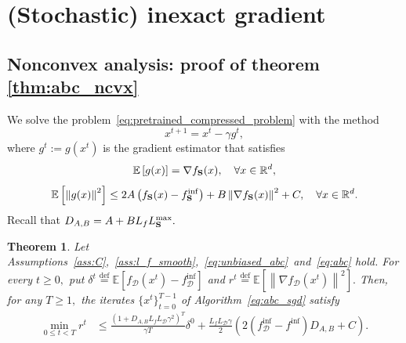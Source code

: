 \documentclass{article}
\newcommand{\bb}{\mathbb}
\newcommand{\eqdef}{\stackrel{\text{def}}{=}}
\newcommand{\Exp}[1]{{\bb E}\left[#1\right]}
\newtheorem{theorem}{Theorem}
\theoremstyle{plain}
\newcommand{\tf}{f_{\mathcal{D}}}
\newcommand{\mS}{{\bf S}}
\theoremstyle{plain}
\theoremstyle{definition}
\theoremstyle{remark}
\begin{document}
\section{(Stochastic) inexact gradient}
\subsection{Nonconvex analysis: proof of theorem \ref{thm:abc_ncvx}}
We solve the problem~\eqref{eq:pretrained_compressed_problem} with the method
\begin{equation}\label{eq:abc_sgd_appendix}
	x^{t+1} = x^t - \gamma g^t,
\end{equation}
where $g^t := g(x^t)$ is the gradient estimator that satisfies
\begin{equation}\label{eq:unbiased_abc_appendix}
	\Exp{g(x)} = \nabla f_{\mS}(x), \quad\forall x \in\mathbb{R}^d,
\end{equation}
\begin{equation}\label{eq:abc_appendix}
	\Exp{\left\|g(x)\right\|^2}\leq 2A\left(f_{\mS}(x) - f^{\inf}_{\mS}\right) + B\left\|\nabla f_{\mS}(x)\right\|^2 + C, \quad\forall x \in\mathbb{R}^d.
\end{equation}
Recall that $D_{A,B}=A+BL_fL_{\mS}^{\max}.$
\begin{theorem}
	Let Assumptions~\ref{ass:C},~\ref{ass:l_f_smooth},~\ref{eq:unbiased_abc}~and~\ref{eq:abc} hold. For every $t\geq 0,$ put $\delta^t\eqdef\mathbb{E}\left[\tf(x^t)-\tf^{\inf}\right]$ and $r^t\eqdef\mathbb{E}\left[\left\|\nabla \tf(x^t)\right\|^2\right].$ Then, for any $T\geq 1,$ the iterates $\{x^t\}_{t=0}^{T-1}$ of Algorithm~\ref{eq:abc_sgd} satisfy
	\begin{equation}\label{eq:main_noncvx_abc}
		\begin{split}
			\min_{0 \leq t < T}r^t &\leq \frac{\left(1+D_{A,B}L_fL_{\mathcal{D}}\gamma^2\right)^T}{\gamma T}\delta^0
			+ \frac{L_fL_{\mathcal{D}}\gamma}{2}\left(2\left(\tf^{\inf} - 	f^{\inf}\right)D_{A,B} + C\right).
		\end{split}
	\end{equation}
\end{theorem}
\end{document}
